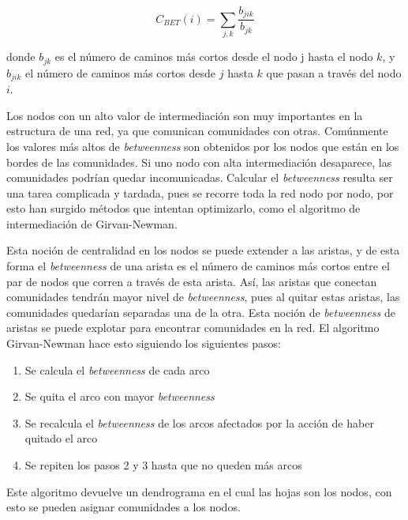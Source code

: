 \documentclass{article}
\begin{document}
\begin{equation}
C_{BET}(i)=\sum_{j,k}\frac{b_{jik}}{b_{jk}} 
\end{equation}

donde $b_{jk}$ es el número de caminos más cortos desde el nodo j hasta el nodo $k$, y $b_{jik}$ el número de caminos más cortos desde $j$ hasta $k$ que pasan a través del nodo $i$.

Los nodos con un alto valor de intermediación son muy importantes en la estructura de una red, ya que comunican comunidades con otras. Comúnmente los valores más altos de \textit{betweenness} son obtenidos por los nodos que están en los bordes de las comunidades. Si uno nodo con alta intermediación desaparece, las comunidades podrían quedar incomunicadas. Calcular el \textit{betweenness} resulta ser una tarea complicada y tardada, pues se recorre toda la red nodo por nodo, por esto han surgido métodos que intentan optimizarlo, como el algoritmo de intermediación de Girvan-Newman.

Esta noción de centralidad en los nodos se puede extender a las aristas, y de esta forma el \textit{betweenness} de una arista es el número de caminos más cortos entre el par de nodos que corren a través de esta arista. Así, las aristas que conectan comunidades tendrán mayor nivel de \textit{betweenness}, pues al quitar estas aristas, las comunidades quedarían separadas una de la otra. Esta noción de \textit{betweenness} de aristas se puede explotar para encontrar comunidades en la red. El algoritmo Girvan-Newman hace esto siguiendo los siguientes pasos:

\begin{enumerate}
\item Se calcula el \textit{betweenness} de cada arco
\item Se quita el arco con mayor \textit{betweenness}
\item Se recalcula el \textit{betweenness} de los arcos afectados por la acción de haber quitado el arco
\item Se repiten los pasos 2 y 3 hasta que no queden más arcos
\end{enumerate}

Este algoritmo devuelve un dendrograma en el cual las hojas son los nodos, con esto se pueden asignar comunidades a los nodos.
\end{document}
